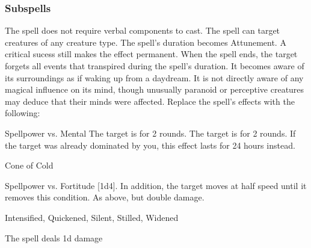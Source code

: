 \subsubsection{Subspells}
The spell does not require verbal components to cast.
The spell can target creatures of any creature type.
The spell's duration becomes Attunement.
A critical sucess still makes the effect permanent.
When the spell ends, the target forgets all events that transpired during the spell's duration.
It becomes aware of its surroundings as if waking up from a daydream.
It is not directly aware of any magical influence on its mind, though unusually paranoid or perceptive creatures may deduce that their minds were affected.
Replace the spell's effects with the following:
\begin{spellcontent}
\begin{augmenteffects}
\begin{spellattack}{Spellpower vs. Mental}
\spellsuccess The target is \confused for 2 rounds.
\spellcritical
The target is \dominated for 2 rounds.
If the target was already dominated by you, this effect lasts for 24 hours instead.
\end{spellattack}
\end{augmenteffects}
\end{spellcontent}
\begin{spellsection}{Cone of Cold}
\begin{spellheader}
\end{spellheader}
\begin{spellcontent}
\begin{spelltargetinginfo}
\end{spelltargetinginfo}
\begin{spelleffects}
\begin{spellattack}{Spellpower vs. Fortitude}
\spellsuccess
{}[1d4].
In addition, the target moves at half speed until it removes this condition.
\spellcritical As above, but double damage.
\end{spellattack}
\end{spelleffects}
\end{spellcontent}
\begin{spellfooter}
 Intensified, Quickened, Silent, Stilled, Widened
\end{spellfooter}
\begin{spellsubcontent}
\begin{spellcantrip}
The spell deals \minus1d damage
\end{spellcantrip}
\end{spellsubcontent}
\end{spellsection}
